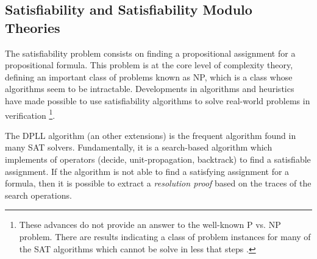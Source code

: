 \subsection{Satisfiability and Satisfiability Modulo Theories}

The satisfiability problem consists on finding a 
propositional assignment for a propositional formula. 
This problem is at the core level of complexity theory, 
defining an important class of problems known as 
NP, which is a class whose
algorithms seem to be intractable.
Developments in algorithms and heuristics \cite{10.5555/2898950, 
935565} have made possible to use satisfiability algorithms 
to solve real-world problems in verification \footnote{These
  advances do not provide an answer to the well-known P vs. NP
  problem. There are results indicating a class of problem instances
  for many of the SAT algorithms which cannot be solve in less that
   steps \cite{10.5555/2898950}.
}.

The DPLL algorithm \cite{10.1145/368273.368557} 
(an other extensions) is the frequent algorithm
found in many SAT solvers. Fundamentally, it is a search-based algorithm
which implements of operators (decide, unit-propagation, backtrack)
to find a satisfiable assignment. If the algorithm is not able to
find a satisfying assignment for a formula, then it is possible to 
extract a \emph{resolution proof} based on the traces of the search
operations.


